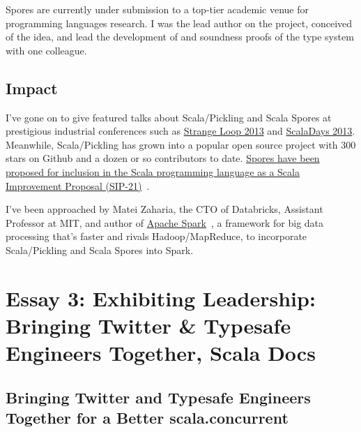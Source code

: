 \documentclass[acmtocl]{acmtrans2m}
\begin{document}
Spores are currently under submission to a top-tier academic venue for
programming languages research. I was the lead author on the project,
conceived of the idea, and lead the development of and soundness proofs of
the type system with one colleague.


\vspace{-0.2in}
\subsection*{\textbf{Impact}}
\vspace{-0.1in}

I've gone on to give featured talks about Scala/Pickling and Scala Spores at
prestigious industrial conferences such as
\href{http://www.infoq.com/presentations/scala-pickles-spores}{Strange Loop
2013} and \href{http://parleys.com/play/51c3799fe4b0d38b54f4625a}{ScalaDays
2013}. Meanwhile, Scala/Pickling has grown into a popular open source project
with 300 stars on Github and a dozen or so contributors to date.
\href{http://docs.scala-lang.org/sips/pending/spores.html}{Spores have been
proposed for inclusion in the Scala programming language as a Scala
Improvement Proposal (SIP-21)}~\cite{Spores}.

I've been approached by Matei Zaharia, the CTO of Databricks, Assistant
Professor at MIT, and author of
\href{https://spark.incubator.apache.org/}{Apache Spark}~\cite{Spark}, a
framework for big data processing that's faster and rivals Hadoop/MapReduce,
to incorporate Scala/Pickling and Scala Spores into Spark.


\section*{\textbf{Essay 3:} Exhibiting Leadership: Bringing Twitter \& Typesafe Engineers Together, Scala Docs}


\vspace{-0.1in}
\subsection*{\textbf{Bringing Twitter and Typesafe Engineers Together for a Better scala.concurrent}}
\vspace{-0.1in}
\end{document}
